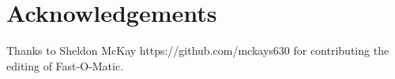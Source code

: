 \section{Acknowledgements}
Thanks to Sheldon McKay https://github.com/mckays630 for contributing the editing of Fast-O-Matic.
